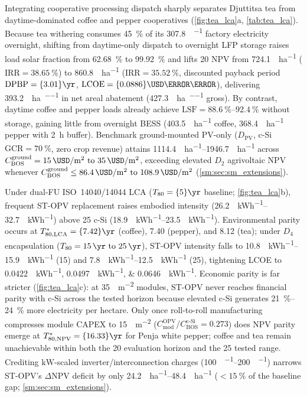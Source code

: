 \documentclass[preprint,12pt,a4paper]{elsarticle}
\begin{document}
Integrating cooperative processing dispatch sharply separates Djuttitsa tea from daytime-dominated coffee and pepper cooperatives (\cref{fig:tea_lca}a, \cref{tab:tea_lca}). Because tea withering consumes \qty{45}{\percent} of its \qty{307.8}{\MWh\per\yr} factory electricity overnight, shifting from daytime-only dispatch to overnight LFP storage raises load solar fraction from \qty{62.68}{\percent} to \qty{99.92}{\percent} and lifts \qty{20}{\yr} NPV from \qty{724.1}{\kUSD\per\hectare} ($\mathrm{IRR} = \qty{38.65}{\percent}$) to \qty{860.8}{\kUSD\per\hectare} ($\mathrm{IRR} = \qty{35.52}{\percent}$, discounted payback period $\mathrm{DPBP} = \qty{3.01}{\yr}$, $\mathrm{LCOE} = \qty{0.0886}{\USD\per\kWh}$), delivering \qty{393.2}{\tCOtwoe\per\hectare\per\yr} in net areal abatement (\qty{427.3}{\tCOtwoe\per\hectare\per\yr} gross). By contrast, daytime coffee and pepper loads already achieve $\mathrm{LSF} = \qtyrange{88.6}{92.4}{\percent}$ without storage, gaining little from overnight BESS (\qty{403.5}{\kUSD\per\hectare} coffee, \qty{368.4}{\kUSD\per\hectare} pepper with \qty{2}{\hour} buffer). Benchmark ground-mounted PV-only ($D_{\mathrm{PV}}$, c-Si $\mathrm{GCR}=\qty{70}{\percent}$, zero crop revenue) attains \qtyrange{1114.4}{1946.7}{\kUSD\per\hectare} across $C_{\mathrm{BOS}}^{\mathrm{ground}}=\qtyrange{15}{35}{\USD\per\square\meter}$, exceeding elevated $D_2$ agrivoltaic NPV whenever $C_{\mathrm{BOS}}^{\mathrm{ground}} \le \qtyrange{86.4}{108.9}{\USD\per\square\meter}$ (\cref{sm:sec:sm_extensions}).

Under dual-FU ISO~14040/14044 LCA ($T_{80}=\qty{5}{\yr}$ baseline; \cref{fig:tea_lca}b), frequent ST-OPV replacement raises embodied intensity (\qtyrange{26.2}{32.7}{\gCOtwoe\per\kWh}) above \qty{25}{\yr} c-Si (\qtyrange{18.9}{23.5}{\gCOtwoe\per\kWh}). Environmental parity occurs at $T_{80,\mathrm{LCA}}^* = \qty{7.42}{\yr}$ (coffee), \qty{7.40}{\yr} (pepper), and \qty{8.12}{\yr} (tea); under $D_4$ encapsulation ($T_{80}=\qtyrange{15}{25}{\yr}$), ST-OPV intensity falls to \qtyrange{10.8}{15.9}{\gCOtwoe\per\kWh} (\qty{15}{\yr}) and \qtyrange{7.8}{12.5}{\gCOtwoe\per\kWh} (\qty{25}{\yr}), tightening LCOE to \qtylist{0.0422;0.0497;0.0646}{\USD\per\kWh}. Economic parity is far stricter (\cref{fig:tea_lca}c): at \qty{35}{\USD\per\square\meter} modules, ST-OPV never reaches financial parity with c-Si across the tested horizon because elevated c-Si generates \qtyrange{21}{24}{\percent} more electricity per hectare. Only once roll-to-roll manufacturing compresses module CAPEX to \qty{15}{\USD\per\square\meter} ($C_{\mathrm{mod}}^{\mathrm{OPV}} / C_{\mathrm{BOS}}^{\mathrm{c\text{-}Si}} = \num{0.273}$) does NPV parity emerge at $T_{80,\mathrm{NPV}}^* = \qty{16.33}{\yr}$ for Penja white pepper; coffee and tea remain unachievable within both the \qty{20}{\yr} evaluation horizon and the \qty{25}{\yr} tested range. Crediting $\mathrm{kW}$-scaled inverter/interconnection charges (\qtyrange{100}{200}{\USD\per\kWp}) narrows ST-OPV's $\Delta\mathrm{NPV}$ deficit by only \qtyrange{24.2}{48.4}{\kUSD\per\hectare} ($<\qty{15}{\percent}$ of the baseline gap; \cref{sm:sec:sm_extensions}).
\end{document}
